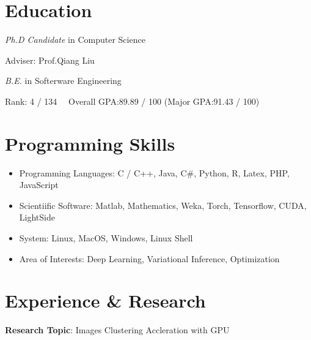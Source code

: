 \documentclass{resume}
\begin{document}




% 
% 
\section{Education}


\textit{Ph.D Candidate} in Computer Science

Adviser: Prof.Qiang Liu \ \ 


\textit{B.E.} in Softerware Engineering

Rank: 4 / 134 \ \  Overall GPA:89.89 / 100 (Major GPA:91.43 / 100)




\section{Programming Skills}
\begin{itemize}[parsep=0.5ex]
  \item Programming Languages: C / C++, Java, C\#, Python, R, Latex, PHP, JavaScript
  \item Scientiific Software: Matlab, Mathematics, Weka, Torch, Tensorflow, CUDA, LightSide
  \item System: Linux, MacOS, Windows, Linux Shell
  \item Area of Interests: Deep Learning, Variational Inference, Optimization
\end{itemize}



%
%



\section{Experience \& Research}

\textbf{Research Topic}: Images Clustering Accleration with GPU 
\end{document}
